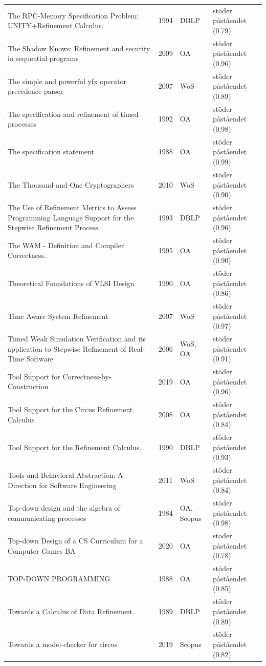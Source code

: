 \begin{longtable}{@{}%
  >{\raggedright\arraybackslash}p{}c%
  >{\raggedright\arraybackslash}p{}%
  >{\raggedright\arraybackslash}p{}@{}}
The RPC-Memory Specification Problem: UNITY+Refinement Calculus. & 1994 & DBLP & stöder påståendet (0.79) \\
The Shadow Knows: Refinement and security in sequential programs & 2009 & OA & stöder påståendet (0.96) \\
The simple and powerful yfx operator precedence parser & 2007 & WoS & stöder påståendet (0.89) \\
The specification and refinement of timed processes & 1992 & OA & stöder påståendet (0.98) \\
The specification statement & 1988 & OA & stöder påståendet (0.99) \\
The Thousand-and-One Cryptographers & 2010 & WoS & stöder påståendet (0.90) \\
The Use of Refinement Metrics to Assess Programming Language Support for the Stepwise Refinement Process. & 1993 & DBLP & stöder påståendet (0.96) \\
The WAM - Definition and Compiler Correctness. & 1995 & OA & stöder påståendet (0.90) \\
Theoretical Foundations of VLSI Design & 1990 & OA & stöder påståendet (0.86) \\
Time Aware System Refinement & 2007 & WoS & stöder påståendet (0.97) \\
Timed Weak Simulation Verification and its application to Stepwise Refinement of Real-Time Software & 2006 & WoS, OA & stöder påståendet (0.91) \\
Tool Support for Correctness-by-Construction & 2019 & OA & stöder påståendet (0.96) \\
Tool Support for the Circus Refinement Calculus & 2008 & OA & stöder påståendet (0.84) \\
Tool Support for the Refinement Calculus. & 1990 & DBLP & stöder påståendet (0.93) \\
Tools and Behavioral Abstraction: A Direction for Software Engineering & 2011 & WoS & stöder påståendet (0.84) \\
Top-down design and the algebra of communicating processes & 1984 & OA, Scopus & stöder påståendet (0.98) \\
Top-down Design of a CS Curriculum for a Computer Games BA & 2020 & OA & stöder påståendet (0.78) \\
TOP-DOWN PROGRAMMING & 1988 & OA & stöder påståendet (0.85) \\
Towards a Calculus of Data Refinement. & 1989 & DBLP & stöder påståendet (0.89) \\
Towards a model-checker for circus & 2019 & Scopus & stöder påståendet (0.82) \\

\end{longtable}
